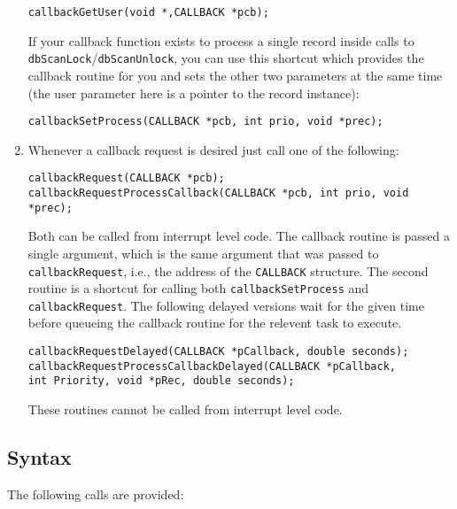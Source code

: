 \begin{enumerate}
\begin{verbatim}
callbackGetUser(void *,CALLBACK *pcb);
\end{verbatim}

If your callback function exists to process a single record inside calls to \verb|dbScanLock|/\verb|dbScanUnlock|, you can use this shortcut which provides the callback routine for you and sets the other two parameters at the same time 
(the user parameter here is a pointer to the record instance):

\begin{verbatim}
callbackSetProcess(CALLBACK *pcb, int prio, void *prec);
\end{verbatim}

\item Whenever a callback request is desired just call one of the following:

\begin{verbatim}
callbackRequest(CALLBACK *pcb);
callbackRequestProcessCallback(CALLBACK *pcb, int prio, void *prec);
\end{verbatim}

Both can be called from interrupt level code. The callback routine is passed a single argument, which is the same 
argument that was passed to \verb|callbackRequest|, i.e., the address of the \verb|CALLBACK| structure. The second 
routine is a shortcut for calling both \verb|callbackSetProcess| and \verb|callbackRequest|. The following delayed 
versions wait for the given time before queueing the callback routine for the relevent task to execute.

\begin{verbatim}
callbackRequestDelayed(CALLBACK *pCallback, double seconds);
callbackRequestProcessCallbackDelayed(CALLBACK *pCallback,
int Priority, void *pRec, double seconds);
\end{verbatim}

These routines cannot be called from interrupt level code.
\end{enumerate}

\subsection{Syntax}

The following calls are provided:

